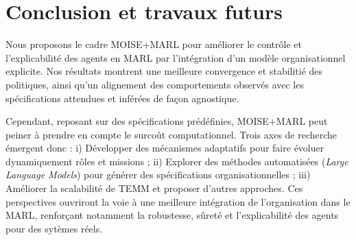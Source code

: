 \documentclass[francais,ROIA,Unicode,manuscript]{cedram}
\begin{document}
\section{Conclusion et travaux futurs}
\label{sec:discussion_conclusion_future_work}

Nous proposons le cadre MOISE+MARL pour améliorer le contrôle et l'explicabilité des agents en MARL par l'intégration d'un modèle organisationnel explicite. Nos résultats montrent une meilleure convergence et stabilitié des politiques, ainsi qu'un alignement des comportements observés avec les spécifications attendues et inférées de façon agnostique.

Cependant, reposant sur des spécifications prédéfinies, MOISE+MARL peut peiner à prendre en compte le surcoût computationnel.
%
Trois axes de recherche émergent donc :
i) Développer des mécanismes adaptatifs pour faire évoluer dynamiquement rôles et missions
; \quad
ii) Explorer des méthodes automatisées (\textit{Large Language Models}) pour générer des spécifications organisationnelles
; \quad
iii) Améliorer la scalabilité de TEMM et proposer d'autres approches.
%
Ces perspectives ouvriront la voie à une meilleure intégration de l'organisation dans le MARL, renforçant notamment la robustesse, sûreté et l'explicabilité des agents pour des sytèmes réels.

\newpage


\bigskip

\setotherabstracts
\end{document}
